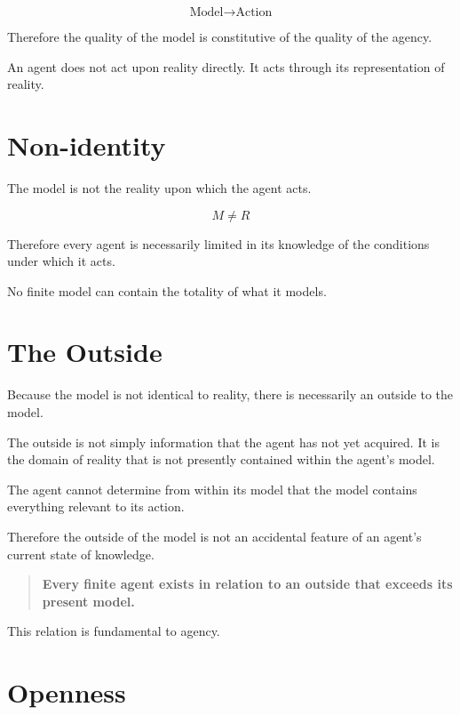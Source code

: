 \documentclass[11pt,a4paper]{article}
\begin{document}
\[
\text{Model} \rightarrow \text{Action}
\]

Therefore the quality of the model is constitutive of the quality of the
agency.

An agent does not act upon reality directly. It acts through its
representation of reality.


\section{Non-identity}

The model is not the reality upon which the agent acts.

\[
M \neq R
\]

Therefore every agent is necessarily limited in its knowledge of the
conditions under which it acts.

No finite model can contain the totality of what it models.


\section{The Outside}

Because the model is not identical to reality, there is necessarily an
outside to the model.

The outside is not simply information that the agent has not yet acquired.
It is the domain of reality that is not presently contained within the
agent's model.

The agent cannot determine from within its model that the model contains
everything relevant to its action.

Therefore the outside of the model is not an accidental feature of an
agent's current state of knowledge.

\begin{quote}
\textbf{Every finite agent exists in relation to an outside that exceeds
its present model.}
\end{quote}

This relation is fundamental to agency.


\section{Openness}
\end{document}
